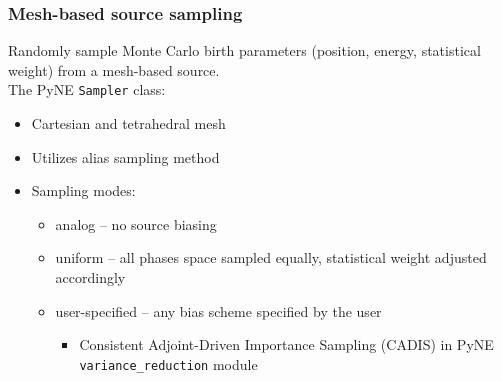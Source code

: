 \documentclass[xcolor=x11names,compress]{beamer}
\begin{document}
\begin{frame}
\frametitle{Mesh-based source sampling}

Randomly sample Monte Carlo birth parameters (position, energy, statistical weight) from a mesh-based source.\\
\vspace{0.3cm}
The PyNE \texttt{Sampler} class:
\begin{itemize}
\item{Cartesian and tetrahedral mesh}
\item{Utilizes alias sampling method \cite{smith_analysis_2005}}
\item{Sampling modes:}
  \begin{itemize}
  \item{analog -- no source biasing}
  \item{uniform -- all phases space sampled equally, statistical weight adjusted accordingly}
  \item{user-specified -- any bias scheme specified by the user}
    \begin{itemize}
    \item{Consistent Adjoint-Driven Importance Sampling (CADIS) in PyNE \texttt{variance\_reduction} module}
    \end{itemize}
  \end{itemize}
\end{itemize}
\end{frame}
\end{document}
